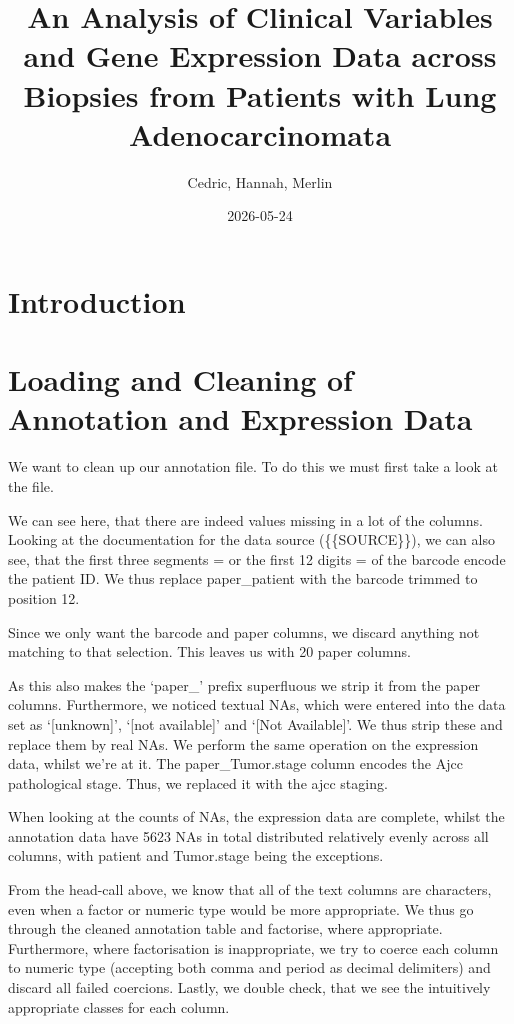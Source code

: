 \documentclass[
]{article}
\title{An Analysis of Clinical Variables and Gene Expression Data across
Biopsies from Patients with Lung Adenocarcinomata}
\author{Cedric, Hannah, Merlin}
\date{2026-05-24}
\begin{document}
\maketitle

\section{Introduction}\label{introduction}

\section{Loading and Cleaning of Annotation and Expression
Data}\label{loading-and-cleaning-of-annotation-and-expression-data}

We want to clean up our annotation file. To do this we must first take a
look at the file.

We can see here, that there are indeed values missing in a lot of the
columns. Looking at the documentation for the data source
(\{\{SOURCE\}\}), we can also see, that the first three segments = or
the first 12 digits = of the barcode encode the patient ID. We thus
replace paper\_patient with the barcode trimmed to position 12.

Since we only want the barcode and paper columns, we discard anything
not matching to that selection. This leaves us with 20 paper columns.

As this also makes the `paper\_' prefix superfluous we strip it from the
paper columns. Furthermore, we noticed textual NAs, which were entered
into the data set as `{[}unknown{]}', `{[}not available{]}' and `{[}Not
Available{]}'. We thus strip these and replace them by real NAs. We
perform the same operation on the expression data, whilst we're at it.
The paper\_Tumor.stage column encodes the Ajcc pathological stage. Thus,
we replaced it with the ajcc staging.

When looking at the counts of NAs, the expression data are complete,
whilst the annotation data have 5623 NAs in total distributed relatively
evenly across all columns, with patient and Tumor.stage being the
exceptions.

From the head-call above, we know that all of the text columns are
characters, even when a factor or numeric type would be more
appropriate. We thus go through the cleaned annotation table and
factorise, where appropriate. Furthermore, where factorisation is
inappropriate, we try to coerce each column to numeric type (accepting
both comma and period as decimal delimiters) and discard all failed
coercions. Lastly, we double check, that we see the intuitively
appropriate classes for each column.
\end{document}
